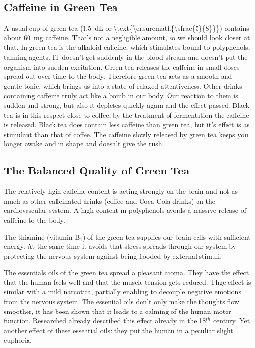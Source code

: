 \documentclass[../main.tex]{subfiles}
\begin{document}
\subsection{Caffeine in Green Tea}

A usual cup of green tea (\SI{1.5}{\deci\liter} or  \SI[parse-numbers=false]{\text{\ensuremath{\sfrac{5}{8}}}}{\cup}) contains about \SI{60}{\mg} caffeine.
That's not a negligible amount, so we should look closer at that.
In green tea is the alkaloid caffeine, which stimulates bound to polyphenols, tanning agents.
IT doesn't get suddenly in the blood stream and doesn't put the organism into sudden excitation.
Green tea releases the caffeine in small doses spread out over time to the body.
Therefore green tea acts as a smooth and gentle tonic, which brings us into a state of relaxed attentiveness.
Other drinks containing caffeine truly act like a bomb in our body.
Our reaction to them is sudden and strong, but also it depletes quickly again and the effect passed.
Black tea is in this respect close to coffee, by the treatment of fermentation the caffeine is released.
Black tea does contain less caffeine than green tea, but it's effect is as stimulant than that of coffee.
The caffeine slowly released by green tea keeps you longer awake and in shape and doesn't give the rush.

\subsection{The Balanced Quality of Green Tea}

The relatively hgih caffeine content is acting strongly on the brain and not as much as other
caffeinated drinks (coffee and Coca Cola drinks) on the cardiovascular system.
A high content in polyphenols avoids a massive release of caffeine to the body.

The thiamine (vitamin B$_1$) of the green tea supplies our brain cells with sufficient energy.
At the same time it avoids that stress spreads through our system by protecting the nervous system against being flooded by external stimuli.

The essentials oils of the green tea spread a pleasant aroma.
They have the effect that the human feels well and that the muscle tension gets reduced.
Thge effect is similar with a mild narcotica, partially enabling to decouple negative emotions from the nervous system.
The essential oils don't only make the thoughts flow smoother, it has been shown that it leads to a calming of the human motor function.
Researched already described this effect already in the 18$^{th}$ century.
Yet another effect of these essential oils: they put the human in a peculiar slight euphoria.
\end{document}
